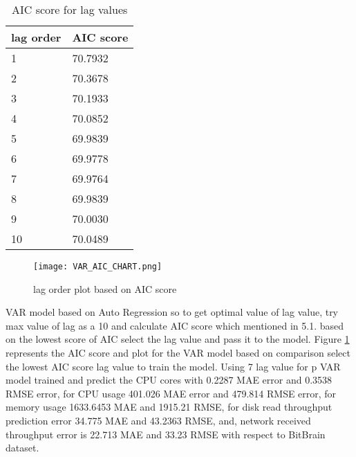 \begin{table}[h]
\caption{AIC score for lag values} %
\centering %

\begin{tabular}{ m{5cm}  m{5cm}} %
\hline\hline %
 
lag order & AIC score\\
\hline\hline
1 & 70.7932\\
2 & 70.3678\\
3 & 70.1933 \\
4 & 70.0852  \\
5 & 69.9839 \\
6 & 69.9778 \\
7 & 69.9764 \\
8 & 69.9839 \\
9 & 70.0030 \\
10 & 70.0489 \\ [1ex]

\hline %
\hline %
\end{tabular}

\label{tab:aictab}
\end{table}

\begin{figure}
  \centering
    
      \texttt{[image: VAR\_AIC\_CHART.png]}
  \caption{lag order plot based on AIC score}
  \label{fig:aic}
\end{figure}

VAR model based on Auto Regression so to get optimal value of lag value, try max value of lag as a 10 and calculate AIC score which mentioned in 5.1. based on the lowest score of AIC select the lag value and pass it to the model.  Figure \ref{fig:aic} represents the AIC score and plot for the VAR model based on comparison select the lowest AIC score lag value to train the model. Using 7 lag value for p VAR model trained and predict the CPU cores with 0.2287 MAE error and 0.3538 RMSE error, for CPU usage 401.026 MAE error and 479.814 RMSE error, for memory usage  1633.6453 MAE and 1915.21 RMSE, for disk read throughput prediction error 34.775 MAE and 43.2363 RMSE, and, network received throughput error is 22.713 MAE and 33.23 RMSE with respect to BitBrain dataset.
